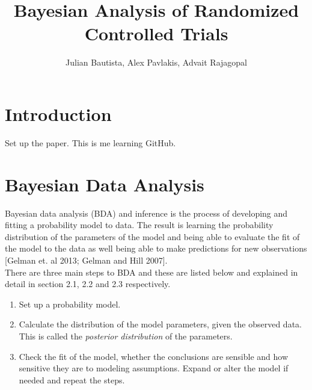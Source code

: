 \documentclass[12pt, oneside]{article}
\title{Bayesian Analysis of Randomized Controlled Trials}
\author{Julian Bautista, Alex Pavlakis, Advait Rajagopal}
\begin{document}
\maketitle

\abstract{}	

\newpage 

\tableofcontents
\newpage

\section{Introduction}
Set up the paper. This is me learning GitHub.

\section{Bayesian Data Analysis}
Bayesian data analysis (BDA) and inference is the process of developing and fitting a probability model to data. The result is learning the probability distribution of the parameters of the model and being able to evaluate the fit of the model to the data as well being able to make predictions for new observations [Gelman et. al 2013; Gelman and Hill 2007].\\
There are three main steps to BDA and these are listed below and explained in detail in section 2.1, 2.2 and 2.3 respectively.
\begin{enumerate}
\item{Set up a probability model.}
\item{Calculate the distribution of the model parameters, given the observed data. This is called the \textit{posterior distribution} of the parameters.}
\item{Check the fit of the model, whether the conclusions are sensible and how sensitive they are to modeling assumptions. Expand or alter the model if needed and repeat the steps.}
\end{enumerate}
\end{document}

